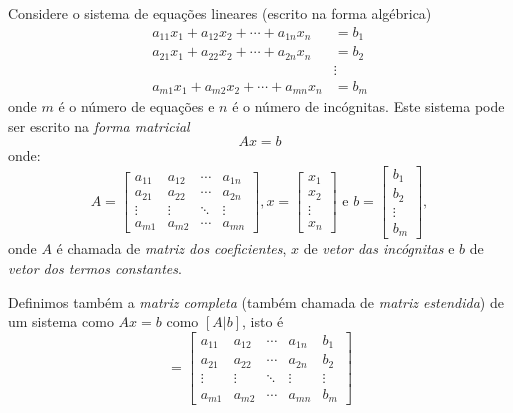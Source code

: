 Considere o sistema de equações lineares (escrito na forma algébrica)
\begin{equation}
  \begin{split}
    a_{11}x_1 + a_{12}x_2 + \cdots +a_{1n}x_n &= b_1\\
    a_{21}x_1 + a_{22}x_2 + \cdots +a_{2n}x_n &= b_2\\
    &\vdots \\
    a_{m1}x_1 + a_{m2}x_2 + \cdots +a_{mn}x_n &= b_m
  \end{split}
\end{equation}
onde $m$ é o número de equações e $n$ é o número de incógnitas.  Este sistema pode ser escrito na \emph{forma matricial}
\begin{equation}
  Ax = b
\end{equation}
onde:
\begin{equation}
  A=\begin{bmatrix}
a_{11} & a_{12} & \cdots & a_{1n}\\
a_{21} & a_{22} & \cdots & a_{2n}\\
\vdots & \vdots & \ddots & \vdots\\
a_{m1} & a_{m2} & \cdots & a_{mn}
\end{bmatrix},
x=\begin{bmatrix}
x_{1} \\
x_{2} \\
\vdots \\
x_{n}
\end{bmatrix}
 \text{ e } b=\begin{bmatrix}
b_{1} \\
b_{2} \\
\vdots \\
b_{m}
\end{bmatrix},
\end{equation}
onde $A$ é chamada de \emph{matriz dos coeficientes}, $x$ de \emph{vetor das incógnitas} e $b$ de \emph{vetor dos termos constantes}.


Definimos também a \emph{matriz completa} (também chamada de \emph{matriz estendida}) de um sistema como $Ax=b$ como $[A|b]$, isto é
\begin{equation}
 [A|b]=\left[\begin{array}{cccc|c}
a_{11} & a_{12} & \cdots & a_{1n}&b_1\\
a_{21} & a_{22} & \cdots & a_{2n}&b_2\\
\vdots & \vdots & \ddots & \vdots&\vdots\\
a_{m1} & a_{m2} & \cdots & a_{mn}&b_m
\end{array}\right]
\end{equation}


